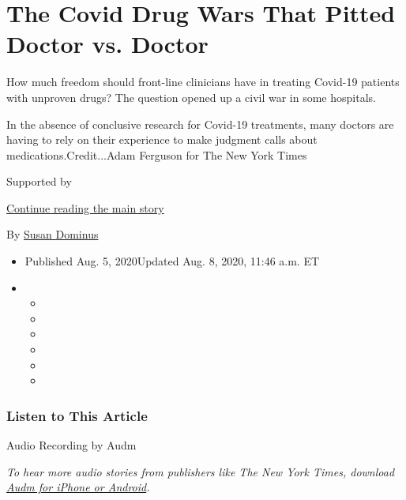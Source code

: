 \hypertarget{the-covid-drug-wars-that-pitted-doctor-vs-doctor}{%
\section{The Covid Drug Wars That Pitted Doctor vs.
Doctor}\label{the-covid-drug-wars-that-pitted-doctor-vs-doctor}}

How much freedom should front-line clinicians have in treating Covid-19
patients with unproven drugs? The question opened up a civil war in some
hospitals.

In the absence of conclusive research for Covid-19 treatments, many
doctors are having to rely on their experience to make judgment calls
about medications.Credit...Adam Ferguson for The New York Times

Supported by

\protect\hyperlink{after-sponsor}{Continue reading the main story}

By \href{https://www.nytimes.com/by/susan-dominus}{Susan Dominus}

\begin{itemize}
\item
  Published Aug. 5, 2020Updated Aug. 8, 2020, 11:46 a.m. ET
\item
  \begin{itemize}
  \item
  \item
  \item
  \item
  \item
  \item
  \end{itemize}
\end{itemize}

\hypertarget{listen-to-this-article}{%
\subsubsection{Listen to This Article}\label{listen-to-this-article}}

Audio Recording by Audm

\emph{To hear more audio stories from publishers like The New York
Times, download}
\href{https://www.audm.com/?utm_source=nytmag\&utm_medium=embed\&utm_campaign=doctor_vs_doctor_dominus}{\emph{Audm
for iPhone or Android}}\emph{.}

